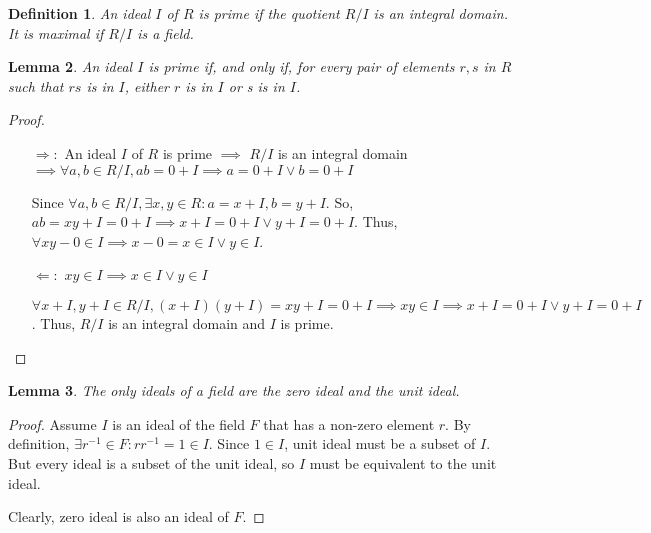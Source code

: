 \documentclass{article}
\newtheorem{defn}{Definition}
\newtheorem{lem}[defn]{Lemma}
\theoremstyle{definition}\newtheorem{definition}{Definition}
\begin{document}
	\begin{defn}
		An ideal $I$ of $R$ is prime if the quotient $R / I$ is an integral domain. It is maximal if $R / I$ is a field.
	\end{defn}
	
	
	\begin{lem}
		An ideal $I$ is prime if, and only if, for every pair of elements $r , s$ in $R$ such that $rs$ is in $I$, either $r$ is in $I$ or s is in $I$.	
	\end{lem}
	\begin{proof}\
		\begin{itemize}
			\item [$\Rightarrow:$] An ideal $I$ of $R$ is prime $\implies$ $R / I$ is an integral domain $\implies \forall a,b \in R/I, ab=0+I \implies a=0+I  \lor b=0+I$
			
			 Since $\forall a,b \in R/I, \exists x,y \in R : a=x+I,b=y+I$. So, $ab=xy+I=0+I \implies x+I=0+I  \lor y+I=0+I$. Thus, $\forall xy-0 \in I \implies x-0=x \in I \lor y \in I$.
			\item [$\Leftarrow:$] $xy \in I \implies x \in I \lor y \in I$ 
				
				$\forall x+I,y+I \in R/I, (x+I)(y+I)=xy+I=0+I \implies xy \in I \implies x+I=0+I \lor y+I =0+I$. Thus, $R / I$ is an integral domain and $I$ is prime.
		\end{itemize}
	\end{proof}
	
	\begin{lem}
		 The only ideals of a field are the zero ideal and the unit ideal.
	\end{lem}
	\begin{proof}
		Assume $I$ is an ideal of the field $F$ that has a non-zero element $r$. By definition, $\exists r^{-1} \in F : rr^{-1}=1\in I$. Since $1 \in I$, unit ideal must be a subset of $I$. But every ideal is a subset of the unit ideal, so $I$ must be equivalent to the unit ideal.
		
		Clearly, zero ideal is also an ideal of $F$.
	\end{proof}
	
\end{document}

